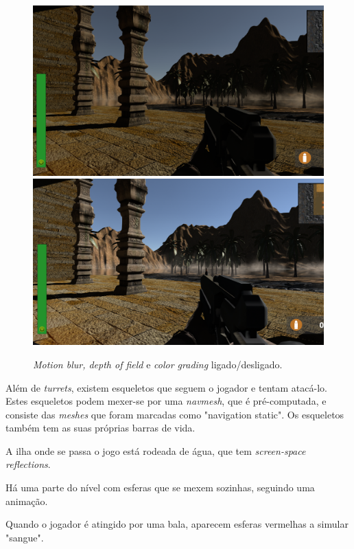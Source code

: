 \documentclass{article}
\begin{document}
\begin{figure}[h]
\begin{center}
            \includegraphics[scale=0.2]{Screenshot_16.png}
            \includegraphics[scale=0.1955]{Screenshot_17.png}
            \caption{\textit{Motion blur, depth of field} e \textit{color grading} ligado/desligado.}
        \end{center}\end{figure}
        \par
        Além de \textit{turrets}, existem esqueletos que seguem o jogador e tentam atacá-lo. Estes esqueletos podem mexer-se por uma \textit{navmesh}, que é pré-computada, e consiste das \textit{meshes} que foram marcadas como "navigation static". Os esqueletos também tem as suas próprias barras de vida.
        \par
        A ilha onde se passa o jogo está rodeada de água, que tem \textit{screen-space reflections}.
        \par
        Há uma parte do nível com esferas que se mexem sozinhas, seguindo uma animação.
        \par
        Quando o jogador é atingido por uma bala, aparecem esferas vermelhas a simular "sangue".
\end{document}
